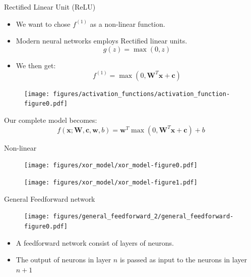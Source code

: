 \documentclass[]{beamer}
\begin{document}
\begin{frame}
   {Rectified Linear Unit (ReLU)}
   \scriptsize
   \begin{minipage}{0.475\linewidth}
      \begin{itemize}
         \item
            We want to chose $f^{(1)}$ as a non-linear function.
         \item
            Modern neural networks employs Rectified linear units.
            \begin{equation*}
               g(z) = \max(0, z)
            \end{equation*}
         \item
            We then get:
            \begin{equation*}
               f^{(1)} = \max(0, \boldsymbol{W}^T \boldsymbol{x} + \boldsymbol{c})
            \end{equation*}
      \end{itemize}
   \end{minipage}
   \begin{minipage}{0.475\linewidth}
   \begin{figure}
      \texttt{[image: figures/activation\_functions/activation\_function-figure0.pdf]}
   \end{figure}
   \end{minipage}
   
   \vspace{1cm}

   Our complete model becomes:
   \begin{equation*}
      f\left( \boldsymbol{x}; \boldsymbol{W}, \boldsymbol{c}, \boldsymbol{w}, b \right) = \boldsymbol{w}^T \max \left(0, \boldsymbol{W}^T \boldsymbol{x} + \boldsymbol{c} \right) + b
   \end{equation*}
\end{frame}

\begin{frame}
   {Non-linear}
   \begin{figure}
      \centering
      \texttt{[image: figures/xor\_model/xor\_model-figure0.pdf]}
   \end{figure}
   \begin{figure}
      \centering
      \texttt{[image: figures/xor\_model/xor\_model-figure1.pdf]}
   \end{figure}
\end{frame}

\begin{frame}
   {General Feedforward network}
   \scriptsize
   \begin{figure}
      \texttt{[image: figures/general\_feedforward\_2/general\_feedforward-figure0.pdf]}
   \end{figure}
   
   \begin{itemize}
      \item
         A feedforward network consist of layers of neurons.
      \item
         The output of neurons in layer $n$ is passed as input to the neurons in layer $n + 1$
   \end{itemize}
\end{frame}
\end{document}
